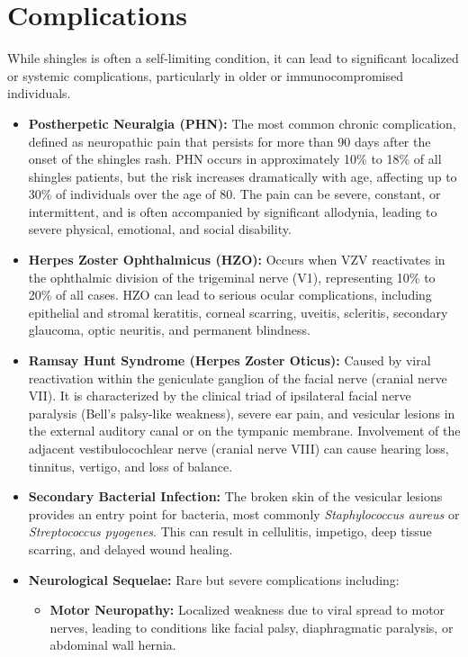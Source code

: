 \section*{Complications}
While shingles is often a self-limiting condition, it can lead to significant localized or systemic complications, particularly in older or immunocompromised individuals.

\begin{itemize}
    \item \textbf{Postherpetic Neuralgia (PHN):} The most common chronic complication, defined as neuropathic pain that persists for more than 90 days after the onset of the shingles rash. PHN occurs in approximately 10\% to 18\% of all shingles patients, but the risk increases dramatically with age, affecting up to 30\% of individuals over the age of 80. The pain can be severe, constant, or intermittent, and is often accompanied by significant allodynia, leading to severe physical, emotional, and social disability.
    \item \textbf{Herpes Zoster Ophthalmicus (HZO):} Occurs when VZV reactivates in the ophthalmic division of the trigeminal nerve (V1), representing 10\% to 20\% of all cases. HZO can lead to serious ocular complications, including epithelial and stromal keratitis, corneal scarring, uveitis, scleritis, secondary glaucoma, optic neuritis, and permanent blindness.
    \item \textbf{Ramsay Hunt Syndrome (Herpes Zoster Oticus):} Caused by viral reactivation within the geniculate ganglion of the facial nerve (cranial nerve VII). It is characterized by the clinical triad of ipsilateral facial nerve paralysis (Bell's palsy-like weakness), severe ear pain, and vesicular lesions in the external auditory canal or on the tympanic membrane. Involvement of the adjacent vestibulocochlear nerve (cranial nerve VIII) can cause hearing loss, tinnitus, vertigo, and loss of balance.
    \item \textbf{Secondary Bacterial Infection:} The broken skin of the vesicular lesions provides an entry point for bacteria, most commonly \textit{Staphylococcus aureus} or \textit{Streptococcus pyogenes}. This can result in cellulitis, impetigo, deep tissue scarring, and delayed wound healing.
    \item \textbf{Neurological Sequelae:} Rare but severe complications including:
    \begin{itemize}
        \item \textbf{Motor Neuropathy:} Localized weakness due to viral spread to motor nerves, leading to conditions like facial palsy, diaphragmatic paralysis, or abdominal wall hernia.

\end{itemize}
\end{itemize}

